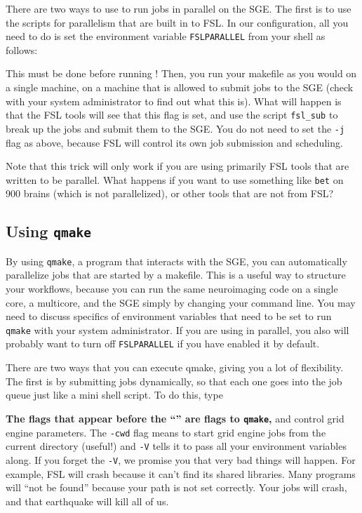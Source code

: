 There are two ways to use \maken{} to run jobs in parallel on the SGE. The first is to use the scripts for parallelism that are built in to FSL. In our configuration, all you need to do is set the environment variable \texttt{FSLPARALLEL} from your shell as follows:

This must be done before running \maken! Then, you run your makefile as you would on a single machine, on a machine that is allowed to submit jobs to the SGE (check with your system administrator to find out what this is). What will happen is that the FSL tools will see that this flag is set, and use the script \texttt{fsl_sub} to break up the jobs and submit them to the SGE. You do not need to set the \texttt{-j} flag as above, because FSL will control its own job submission and scheduling. 

Note that this trick will only work if you are using primarily FSL tools that are written to be parallel. What happens if you want to use something like \texttt{bet} on 900 brains (which is not parallelized), or other tools that are not from FSL?

\subsection{Using \texttt{qmake}}

By using \texttt{qmake}, a program that interacts with the SGE, you can automatically parallelize jobs that are started by a makefile. This is a useful way to structure your workflows, because you can run the same neuroimaging code on a single core, a multicore, and the SGE simply by changing your command line. You may need to discuss specifics of environment variables that need to be set to run \texttt{qmake} with your system administrator. If you are using \maken{} in parallel, you also will probably want to turn off \texttt{FSLPARALLEL} if you have enabled it by default.

There are two ways that you can execute qmake, giving you a lot of flexibility. The first is by submitting jobs dynamically, so that each one goes into the job queue just like a mini shell script. To do this, type

\textbf{The flags that appear before the ``\dd{}'' are flags to \texttt{qmake},} and control grid engine parameters. The \texttt{-cwd} flag means to start grid engine jobs from the current directory (useful!) and \texttt{-V} tells it to pass all your environment variables along. If you forget the \texttt{-V}, we promise you that very bad things will happen. For example, FSL will crash because it can't find its shared libraries. Many programs will ``not be found'' because your path is not set correctly. Your jobs will crash, and that earthquake will kill all of us.

